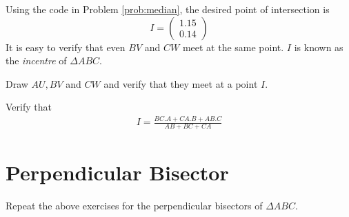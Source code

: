 \documentclass[journal,12pt,twocolumn]{IEEEtran}
\begin{document}
\solution Using the code in Problem \ref{prob:median}, the desired point of intersection is
\begin{equation}
I = 
\begin{pmatrix}
1.15
\\
0.14
\end{pmatrix}
\end{equation}
%
It is easy to verify that even $BV$ and $CW$ meet at the same point.  $I$ is known as
the {\em incentre} of $\Delta ABC$. 
\begin{problem}
Draw $AU, BV$ and $CW$ and verify that they meet at a point $I$.  
\end{problem}
%
%
\begin{problem}
Verify that
\begin{align}
I = \frac{BC.A + CA.B + AB.C}{AB+BC+CA}
\end{align}
%
\end{problem}
\section{Perpendicular Bisector}
\begin{problem}
Repeat the above exercises for the perpendicular bisectors of $\Delta ABC$.
\end{problem}
%

% 
% 
%
\end{document}

